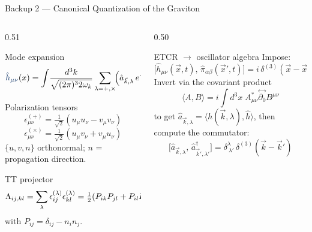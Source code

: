 \documentclass[aspectratio=169]{beamer}
\begin{document}
\begin{frame}[c]{Backup 2 — Canonical Quantization of the Graviton}
 
\begin{columns}[T,totalwidth=\textwidth]
 
\begin{column}{0.51\textwidth}
 
\begin{block}{Mode expansion}
\footnotesize
\[
\grav{\hat{h}_{\mu\nu}}(x)=\int\!\frac{d^3k}{\sqrt{(2\pi)^3 2\omega_k}}
\sum_{\lambda=+,\times}
\!\Bigl(\hat{a}_{\vec{k},\lambda}\,e^{-ik\cdot x}\,\epsilon_{\mu\nu}^{(\lambda)}
+\mathrm{h.c.}\Bigr)
\]
\end{block}
 
 
\begin{block}{Polarization tensors}
\footnotesize
\[
\epsilon^{(+)}_{\mu\nu}=\tfrac{1}{\sqrt{2}}(u_\mu u_\nu - v_\mu v_\nu)
\]
\[
\epsilon^{(\times)}_{\mu\nu}=\tfrac{1}{\sqrt{2}}(u_\mu v_\nu + v_\mu u_\nu)
\]
$\{u,v,n\}$ orthonormal; $n$ = propagation direction.
\end{block}
 
 \vspace{-0.1cm}
\begin{block}{TT projector}
\footnotesize
\[
\Lambda_{ij,kl}=\sum_\lambda\epsilon^{(\lambda)}_{ij}\epsilon^{(\lambda)}_{kl}
=\tfrac{1}{2}\!\left(P_{ik}P_{jl}+P_{il}P_{jk}-P_{ij}P_{kl}\right)
\]
with $P_{ij}=\delta_{ij}-n_i n_j$.
\end{block}
 
\end{column}
 
\begin{column}{0.50\textwidth}
 
\begin{block}{ETCR $\to$ oscillator algebra}
\footnotesize
Impose:
\[
\bigl[\hat{h}_{\mu\nu}(\vec{x},t),\,\hat{\pi}_{\alpha\beta}(\vec{x}',t)\bigr]
=i\,\delta^{(3)}(\vec{x}-\vec{x}')\,\delta^{\mu\nu}_{\ \,\alpha\beta}
\]
\vspace{-0.2cm}
Invert via the covariant product
\[
\langle A,B\rangle = i\!\int d^3x\;
A^{*}_{\mu\nu}\overset{\leftrightarrow}{\partial_0}B^{\mu\nu}
\]
to get $\hat{a}_{\vec{k},\lambda}=\langle h(\vec{k},\lambda),\hat{h}\rangle$,
then compute the commutator:
\[
\boxed{
\bigl[\hat{a}_{\vec{k},\lambda},\,\hat{a}^\dagger_{\vec{k}',\lambda'}\bigr]
=\delta^{\lambda}_{\ \lambda'}\,\delta^{(3)}(\vec{k}-\vec{k}')
}
\]
\end{block}
 

 
\end{column}
\end{columns}
 
\end{frame}
 
\end{document}
